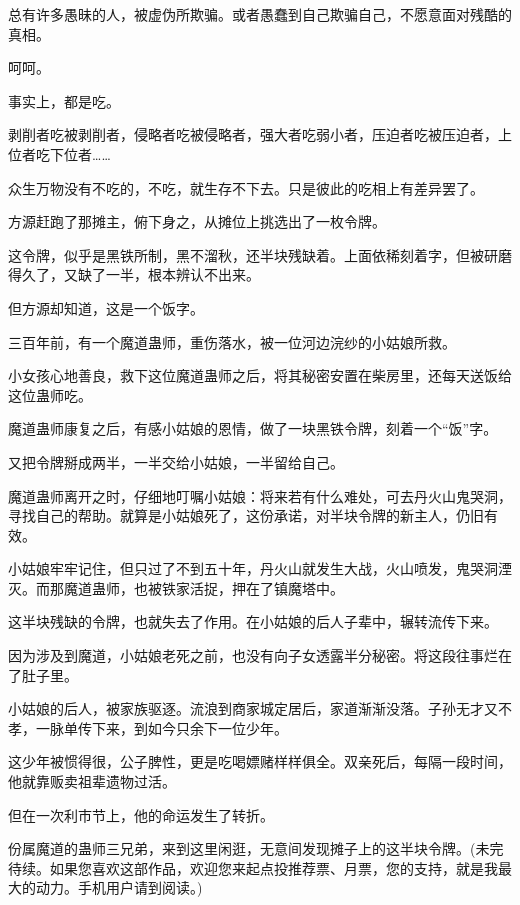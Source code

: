 \begin{this_body}
总有许多愚昧的人，被虚伪所欺骗。或者愚蠢到自己欺骗自己，不愿意面对残酷的真相。

呵呵。

事实上，都是吃。

剥削者吃被剥削者，侵略者吃被侵略者，强大者吃弱小者，压迫者吃被压迫者，上位者吃下位者……

众生万物没有不吃的，不吃，就生存不下去。只是彼此的吃相上有差异罢了。

方源赶跑了那摊主，俯下身之，从摊位上挑选出了一枚令牌。

这令牌，似乎是黑铁所制，黑不溜秋，还半块残缺着。上面依稀刻着字，但被研磨得久了，又缺了一半，根本辨认不出来。

但方源却知道，这是一个饭字。

三百年前，有一个魔道蛊师，重伤落水，被一位河边浣纱的小姑娘所救。

小女孩心地善良，救下这位魔道蛊师之后，将其秘密安置在柴房里，还每天送饭给这位蛊师吃。

魔道蛊师康复之后，有感小姑娘的恩情，做了一块黑铁令牌，刻着一个“饭”字。

又把令牌掰成两半，一半交给小姑娘，一半留给自己。

魔道蛊师离开之时，仔细地叮嘱小姑娘：将来若有什么难处，可去丹火山鬼哭洞，寻找自己的帮助。就算是小姑娘死了，这份承诺，对半块令牌的新主人，仍旧有效。

小姑娘牢牢记住，但只过了不到五十年，丹火山就发生大战，火山喷发，鬼哭洞湮灭。而那魔道蛊师，也被铁家活捉，押在了镇魔塔中。

这半块残缺的令牌，也就失去了作用。在小姑娘的后人子辈中，辗转流传下来。

因为涉及到魔道，小姑娘老死之前，也没有向子女透露半分秘密。将这段往事烂在了肚子里。

小姑娘的后人，被家族驱逐。流浪到商家城定居后，家道渐渐没落。子孙无才又不孝，一脉单传下来，到如今只余下一位少年。

这少年被惯得很，公子脾性，更是吃喝嫖赌样样俱全。双亲死后，每隔一段时间，他就靠贩卖祖辈遗物过活。

但在一次利市节上，他的命运发生了转折。

份属魔道的蛊师三兄弟，来到这里闲逛，无意间发现摊子上的这半块令牌。(未完待续。如果您喜欢这部作品，欢迎您来起点投推荐票、月票，您的支持，就是我最大的动力。手机用户请到阅读。)

\end{this_body}

